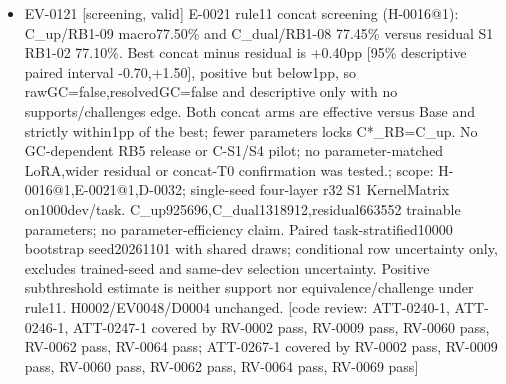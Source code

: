 \documentclass[11pt]{article}
\begin{document}
\begin{itemize}
\item EV-0121 [screening, valid] E-0021 rule11 concat screening (H-0016@1): C\_up/RB1-09 macro77.50\% and C\_dual/RB1-08 77.45\% versus residual S1 RB1-02 77.10\%. Best concat minus residual is +0.40pp [95\% descriptive paired interval -0.70,+1.50], positive but below1pp, so rawGC=false,resolvedGC=false and descriptive only with no supports/challenges edge. Both concat arms are effective versus Base and strictly within1pp of the best; fewer parameters locks C*\_RB=C\_up. No GC-dependent RB5 release or C-S1/S4 pilot; no parameter-matched LoRA,wider residual or concat-T0 confirmation was tested.; scope: H-0016@1,E-0021@1,D-0032; single-seed four-layer r32 S1 KernelMatrix on1000dev/task. C\_up925696,C\_dual1318912,residual663552 trainable parameters; no parameter-efficiency claim. Paired task-stratified10000 bootstrap seed20261101 with shared draws; conditional row uncertainty only, excludes trained-seed and same-dev selection uncertainty. Positive subthreshold estimate is neither support nor equivalence/challenge under rule11. H0002/EV0048/D0004 unchanged. [code review: ATT-0240-1, ATT-0246-1, ATT-0247-1 covered by RV-0002 pass, RV-0009 pass, RV-0060 pass, RV-0062 pass, RV-0064 pass; ATT-0267-1 covered by RV-0002 pass, RV-0009 pass, RV-0060 pass, RV-0062 pass, RV-0064 pass, RV-0069 pass]

\end{itemize}
\end{document}
